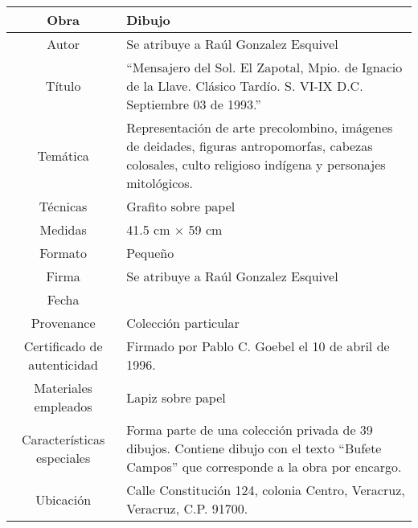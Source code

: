 \documentclass[10pt,letter]{report}
\begin{document}
\begin{table}[H]
\centering
\begin{tabular}{|c|m{}|}
\hline
Obra& Dibujo	\\
\hline
Autor & Se atribuye a Ra\'ul Gonzalez Esquivel\\
\hline
T\'itulo & ``Mensajero del Sol. El Zapotal, Mpio. de Ignacio de la Llave. Cl\'asico Tard\'io. S. VI-IX D.C. Septiembre 03 de 1993.''\\
\hline
Tem\'atica & Representaci\'on de arte precolombino, im\'agenes de deidades, figuras antropomorfas, cabezas colosales, culto religioso ind\'igena y personajes mitol\'ogicos.\\
\hline
T\'ecnicas &Grafito sobre papel \\
\hline
Medidas & 41.5 cm $\times$ 59 cm \\
\hline
 Formato & Peque\~no \\
 \hline
 Firma & Se atribuye a Ra\'ul Gonzalez Esquivel \\
 \hline
  Fecha & \\
 \hline
 Provenance & Colecci\'on particular\\
 \hline
 Certificado de autenticidad& Firmado por Pablo C. Goebel el 10 de abril de 1996.  \\
 \hline 
  Materiales empleados & Lapiz sobre papel\\
 \hline
 Caracter\'isticas especiales & Forma parte de una colecci\'on privada de 39 dibujos. 
Contiene dibujo con el texto ``Bufete Campos'' que corresponde a la obra por encargo. \\
\hline 
Ubicaci\'on & Calle Constituci\'on 124, colonia Centro, Veracruz, Veracruz, C.P. 91700.\\
\hline

\end{tabular}
\end{table}
\end{document}
